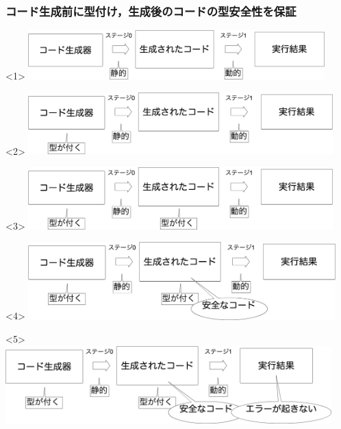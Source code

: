
\begin{frame}
  \frametitle{コード生成前に型付け，生成後のコードの型安全性を保証}
  \begin{onlyenv}<1>
    \center
    \includegraphics[clip,height=1.9cm]{./img/prggen.png}
  \end{onlyenv}

  \begin{onlyenv}<2>
    \center
    \includegraphics[clip,height=2.4cm]{./img/prggen_type1.png}
  \end{onlyenv}

  \begin{onlyenv}<3>
    \center
    \includegraphics[clip,height=2.4cm]{./img/prggen_type2.png}
  \end{onlyenv}

  \begin{onlyenv}<4>
    \center
    \includegraphics[clip,height=3.0cm]{./img/prggen_type3.png}
  \end{onlyenv}

  \begin{onlyenv}<5>
    \center
    \includegraphics[clip,height=3.0cm]{./img/prggen_type4.png}
  \end{onlyenv}
\end{frame}

